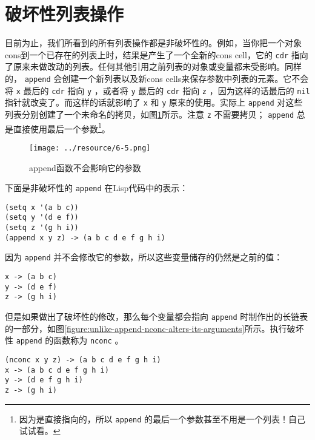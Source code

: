 \section{破坏性列表操作}
\label{section:06-Destructive-List-Operations}

目前为止，我们所看到的所有列表操作都是非破坏性的。例如，当你把一个对象cons到一个已存在的列表上时，结果是产生了一个全新的cons cell，它的 \texttt{cdr} 指向了原来未做改动的列表。任何其他引用之前列表的对象或变量都未受影响。同样的， \texttt{append} 会创建一个新列表以及新cons cells来保存参数中列表的元素。它不会将 \texttt{x} 最后的 \texttt{cdr} 指向 \texttt{y} ，或者将 \texttt{y} 最后的 \texttt{cdr} 指向 \texttt{z} ，因为这样的话最后的 \texttt{nil} 指针就改变了。而这样的话就影响了 \texttt{x} 和 \texttt{y} 原来的使用。实际上 \texttt{append} 对这些列表分别创建了一个未命名的拷贝，如图\ref{figure:the-append-function-does-not-alter-its-arguments}所示。注意 \texttt{z} 不需要拷贝； \texttt{append} 总是直接使用最后一个参数\footnote{因为是直接指向的，所以 \texttt{append} 的最后一个参数甚至不用是一个列表！自己试试看。}。

\begin{figure}[hbt!]
  \texttt{[image: ../resource/6-5.png]}
  \caption{append函数不会影响它的参数}
  \label{figure:the-append-function-does-not-alter-its-arguments}
\end{figure}

下面是非破坏性的 \texttt{append} 在Lisp代码中的表示：

\begin{verbatim}
(setq x '(a b c))
(setq y '(d e f))
(setq z '(g h i))
(append x y z) -> (a b c d e f g h i)
\end{verbatim}

因为 \texttt{append} 并不会修改它的参数，所以这些变量储存的仍然是之前的值：

\begin{verbatim}
x -> (a b c)
y -> (d e f)
z -> (g h i)
\end{verbatim}

但是如果做出了破坏性的修改，那么每个变量都会指向 \texttt{append} 时制作出的长链表的一部分，如图\ref{figure:unlike-append-nconc-alters-its-arguments}所示。执行破坏性 \texttt{append} 的函数称为 \texttt{nconc} 。

\begin{verbatim}
(nconc x y z) -> (a b c d e f g h i)
x -> (a b c d e f g h i)
y -> (d e f g h i)
z -> (g h i)
\end{verbatim}

